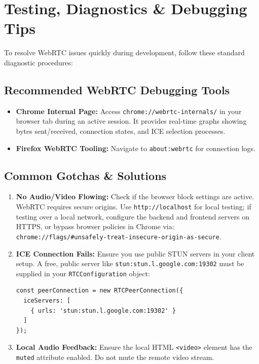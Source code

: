 \documentclass[11pt,a4paper]{article}
\begin{document}
\newpage

\section{Testing, Diagnostics \& Debugging Tips}

To resolve WebRTC issues quickly during development, follow these standard diagnostic procedures:

\subsection{Recommended WebRTC Debugging Tools}
\begin{itemize}
    \item \textbf{Chrome Internal Page:} Access \texttt{chrome://webrtc-internals/} in your browser tab during an active session. It provides real-time graphs showing bytes sent/received, connection states, and ICE selection processes.
    \item \textbf{Firefox WebRTC Tooling:} Navigate to \texttt{about:webrtc} for connection logs.
\end{itemize}

\subsection{Common Gotchas \& Solutions}
\begin{enumerate}
    \item \textbf{No Audio/Video Flowing:} Check if the browser block settings are active. WebRTC requires secure origins. Use \texttt{http://localhost} for local testing; if testing over a local network, configure the backend and frontend servers on HTTPS, or bypass browser policies in Chrome via:
    \texttt{chrome://flags/\#unsafely-treat-insecure-origin-as-secure}.
    \item \textbf{ICE Connection Fails:} Ensure you use public STUN servers in your client setup. A free, public server like \texttt{stun:stun.l.google.com:19302} must be supplied in your \texttt{RTCConfiguration} object:
\begin{lstlisting}
const peerConnection = new RTCPeerConnection({
  iceServers: [
    { urls: 'stun:stun.l.google.com:19302' }
  ]
});
\end{lstlisting}
    \item \textbf{Local Audio Feedback:} Ensure the local HTML \texttt{<video>} element has the \texttt{muted} attribute enabled. Do not mute the remote video stream.
\end{enumerate}
\end{document}
